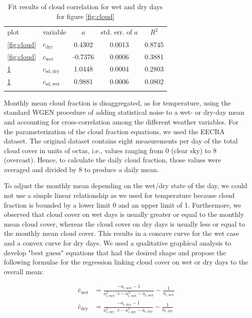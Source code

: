 \documentclass[
11pt, %
english, %
singlespacing, %
headsepline, %
]{MastersDoctoralThesis} %
\newcommand\tophline{\hline\noalign{\vspace{1mm}}}
\newcommand\middlehline{\noalign{\vspace{1mm}}\hline\noalign{\vspace{1mm}}}
\newcommand\bottomhline{\noalign{\vspace{1mm}}\hline}
\begin{document}
\begin{NoHyper}
\begin{refsection}
\begin{figure}
	\label{fig:cloud_sd}
\end{figure}
\begin{table}[t]
	\caption[Fit results of cloud correlation for wet and dry days.]{Fit results of cloud correlation for wet and dry days for figure \ref{fig:cloud}}
	\label{tab:cloud-corr}
	\begin{tabular}{llccc}
		\tophline
		plot &                         variable &     $a$ & std. err. of $a$ &  $R^2$ \\
		\middlehline
		\ref{fig:cloud} &  $c_{\mathrm{dry}}$ & 0.4302 & 0.0013 & 0.8745 \\
		\ref{fig:cloud} &  $c_{\mathrm{wet}}$ & -0.7376 & 0.0006 & 0.3881 \\
		\ref{fig:cloud_sd} &  $c_{\mathrm{sd}, \mathrm{dry}}$ & 1.0448 & 0.0004 & 0.2803 \\
		\ref{fig:cloud_sd} &  $c_{\mathrm{sd}, \mathrm{wet}}$ & 0.9881 & 0.0006 & 0.0802 \\
		\bottomhline
	\end{tabular}
\end{table}

Monthly mean cloud fraction is disaggregated, as for temperature, using the standard WGEN procedure of adding statistical noise to a wet- or dry-day mean and accounting for cross-correlation among the different weather variables. For the parameterization of the cloud fraction equations, we used the EECRA dataset. The original dataset contains eight measurements per day of the total cloud cover in units of octas, i.e., values ranging from 0 (clear sky) to 8 (overcast). Hence, to calculate the daily cloud fraction, those values were averaged and divided by 8 to produce a daily mean.

To adjust the monthly mean depending on the wet/dry state of the day, we could not use a simple linear relationship as we used for temperature because cloud fraction is bounded by a lower limit 0 and an upper limit of 1. Furthermore, we observed that cloud cover on wet days is usually greater or equal to the monthly mean cloud cover, whereas the cloud cover on dry days is usually less or equal to the monthly mean cloud cover. This results in a concave curve for the wet case and a convex curve for dry days. We used a qualitative graphical analysis to develop "best guess" equations that had the desired shape and propose the following formulae for the regression linking cloud cover on wet or dry days to the overall mean:

\begin{align}
\bar{\mathrm{c}}_\mathrm{wet} &= \frac{-a_{\mathrm{c}, \mathrm{wet}} - 1}{a_{\mathrm{c}, \mathrm{wet}}^2 \cdot \bar{c} - a_{\mathrm{c}, \mathrm{wet}}^2 - a_{\mathrm{c}, \mathrm{wet}}}  - \frac{1}{a_{\mathrm{c}, \mathrm{wet}}} \nonumber \\
\bar{\mathrm{c}}_\mathrm{dry} &= \frac{-a_{\mathrm{c}, \mathrm{dry}} - 1}{a_{\mathrm{c}, \mathrm{dry}}^2 \cdot \bar{c} - a_{\mathrm{c}, \mathrm{dry}}^2 - a_{\mathrm{c}, \mathrm{dry}}}  - \frac{1}{a_{\mathrm{c}, \mathrm{dry}}}
\label{eq:cloud_mean}
\end{align}


\end{refsection}
\end{NoHyper}
\end{document}
